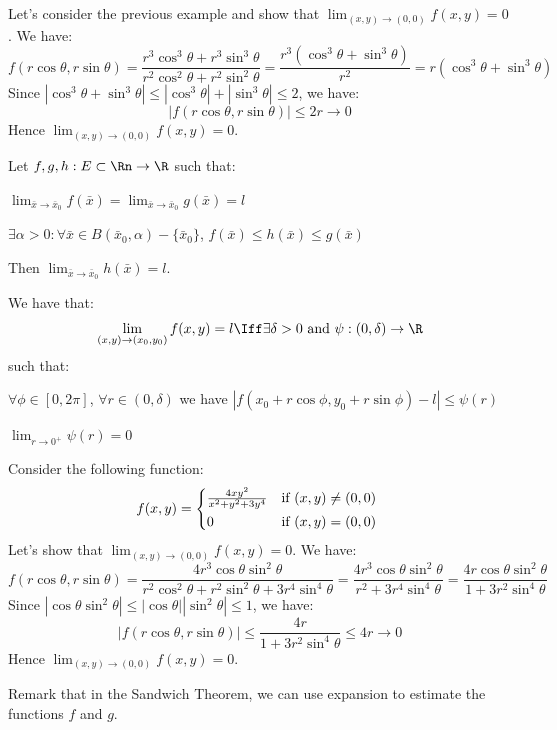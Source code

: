 \begin{eg}
    Let's consider the previous example and show that $\lim_{(x,y) \to (0,0)} f(x,y) = 0$. We have:
    \[
        f(r \cos \theta, r \sin \theta) = \frac{r^3 \cos^3 \theta + r^3 \sin^3 \theta}{r^2 \cos^2 \theta + r^2 \sin^2 \theta} = \frac{r^3 (\cos^3 \theta + \sin^3 \theta)}{r^2} = r (\cos^3 \theta + \sin^3 \theta)
    \]
    Since $|\cos^3 \theta + \sin^3 \theta| \leq |\cos^3 \theta| + |\sin^3 \theta| \leq 2$, we have:
    \[
        |f(r \cos \theta, r \sin \theta)| \leq 2r \to 0
    \]
    Hence $\lim_{(x,y) \to (0,0)} f(x,y) = 0$.
\end{eg}

\begin{theorem}
    Let $f,g,h: E \subset \Rn \to \R$ such that:
    \begin{citemize}
        \item $\lim_{\bar{x} \to \bar{x}_0} f(\bar{x}) = \lim_{\bar{x} \to \bar{x}_0} g(\bar{x}) = l$
        \item $\exists \alpha > 0 : \forall \bar{x} \in B(\bar{x}_0, \alpha) - \{\bar{x}_0\}$, $f(\bar{x}) \leq h(\bar{x}) \leq g(\bar{x})$
    \end{citemize}
    Then $\lim_{\bar{x} \to \bar{x}_0} h(\bar{x}) = l$.
\end{theorem}

\begin{theorem}
    We have that:
    \[
        \lim_{(x,y) \to (x_0, y_0)} f(x,y) = l \Iff \exists \delta > 0 \text{ and } \psi : (0, \delta) \to \R
    \]
    such that:
    \begin{citemize}
        \item $\forall \phi \in [0, 2\pi]$, $\forall r \in (0, \delta)$ we have $|f(x_0 + r \cos \phi, y_0 + r \sin \phi) - l| \leq \psi(r)$ 
        \item $\lim_{r \to 0^+} \psi(r) = 0$
    \end{citemize}
\end{theorem}

\begin{eg}
    Consider the following function:
    \[
        f(x,y) = \begin{cases*}
            \frac{4xy^2}{x^2 + y^2 + 3y^4} & if $(x,y) \neq (0,0)$ \\
            0 & if $(x,y) = (0,0)$
        \end{cases*}
    \]
    Let's show that $\lim_{(x,y) \to (0,0)} f(x,y) = 0$. We have:
    \[
        f(r \cos \theta, r \sin \theta) = \frac{4r^3 \cos \theta \sin^2 \theta}{r^2 \cos^2 \theta + r^2 \sin^2 \theta + 3r^4 \sin^4 \theta} = \frac{4r^3 \cos \theta \sin^2 \theta}{r^2 + 3r^4 \sin^4 \theta} = \frac{4r \cos \theta \sin^2 \theta}{1 + 3r^2 \sin^4 \theta}
    \]
    Since $|\cos \theta \sin^2 \theta| \leq |\cos \theta| |\sin^2 \theta| \leq 1$, we have:
    \[
        |f(r \cos \theta, r \sin \theta)| \leq \frac{4r}{1 + 3r^2 \sin^4 \theta} \leq 4r \to 0
    \]
    Hence $\lim_{(x,y) \to (0,0)} f(x,y) = 0$.
\end{eg}
Remark that in the Sandwich Theorem, we can use expansion to estimate the functions $f$ and $g$. 

